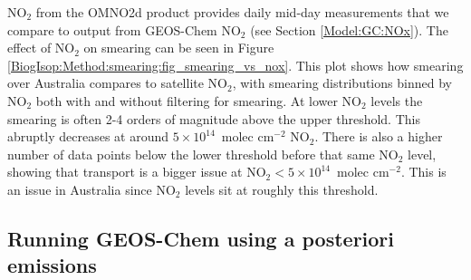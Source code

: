       NO$_2$ from the OMNO2d product provides daily mid-day measurements that we compare to output from GEOS-Chem NO$_2$ (see Section \ref{Model:GC:NOx}).
      The effect of NO$_2$ on smearing can be seen in Figure \ref{BiogIsop:Method:smearing:fig_smearing_vs_nox}.
      This plot shows how smearing over Australia compares to satellite NO$_2$, with smearing distributions binned by NO$_2$ both with and without filtering for smearing.
      At lower NO$_2$ levels the smearing is often 2-4 orders of magnitude above the upper threshold. 
      This abruptly decreases at around $5 \times 10^{14} $~molec cm$^{-2}$ NO$_2$.
      There is also a higher number of data points below the lower threshold before that same NO$_2$ level, showing that transport is a bigger issue at NO$_2 < 5 \times 10^{14} $~molec cm$^{-2}$. 
      This is an issue in Australia since NO$_2$ levels sit at roughly this threshold.
      
      
  \subsection{Running GEOS-Chem using a posteriori emissions}
  \label{BioIsop:method:scaled}
    
